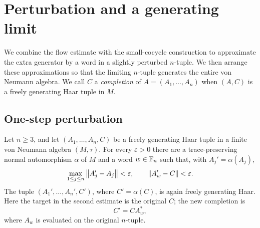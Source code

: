 \section{Perturbation and a generating limit}
\label{sec:generation}

We combine the flow estimate with the small-cocycle construction to
approximate the extra generator by a word in a slightly perturbed
$n$-tuple.  We then arrange these approximations so that the limiting
$n$-tuple generates the entire von Neumann algebra.
We call $C$ a \emph{completion} of $A=(A_1,\ldots,A_n)$ when
$(A,C)$ is a freely generating Haar tuple in $M$.

\subsection{One-step perturbation}

\begin{proposition}
\label{prop:perturbation}
Let $n\geq 3$, and let $(A_1,\ldots,A_n,C)$ be a freely generating Haar
tuple in a finite von Neumann algebra $(M,\tau)$.  For every
$\varepsilon>0$ there are a trace-preserving normal automorphism
$\alpha$ of $M$ and a word $w\in\mathbb F_n$ such that, with
$A_j'=\alpha(A_j)$,
\begin{equation}
\label{eq:perturbation}
 \max_{1\leq j\leq n}\left\lVert A_j'-A_j\right\rVert<\varepsilon,
 \qquad
 \left\lVert A_w'-C\right\rVert<\varepsilon.
\end{equation}
The tuple $(A_1',\ldots,A_n',C')$, where $C'=\alpha(C)$, is again freely
generating Haar.  Here the target in the second estimate is the
original $C$; the new completion is
\[
 C'=C A_w^*,
\]
where $A_w$ is evaluated on the original $n$-tuple.
\end{proposition}


